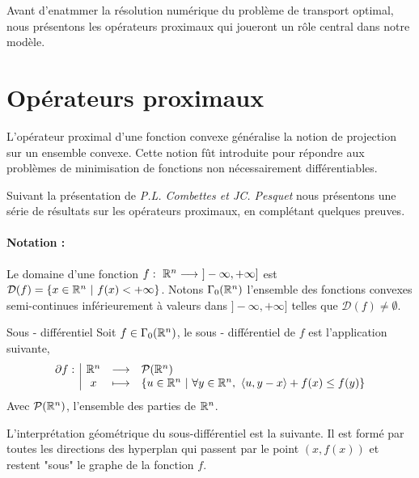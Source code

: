 \documentclass[a4paper,12pt]{article}
\begin{document}
Avant d'enatmmer la résolution numérique du problème de transport optimal, nous présentons les opérateurs proximaux qui joueront un rôle central dans notre modèle. 

\newpage
\section{Opérateurs proximaux}
L'opérateur proximal d'une fonction convexe généralise la notion de projection sur un ensemble convexe. Cette notion fût introduite pour répondre aux problèmes de minimisation de fonctions non nécessairement différentiables. 

Suivant la présentation de \emph{P.L. Combettes \emph{et} JC. Pesquet} \cite{combettes} nous présentons une série de résultats sur les opérateurs proximaux, en complétant quelques preuves.
\paragraph{Notation :}Le domaine d'une fonction $f:\ \RR^n\longrightarrow\ ]-\infty,+\infty]$ est $\mathcal{D}(f) = \{ x\in\mathbb{R}^n\ |\ f(x) < +\infty \} $. Notons $\Gamma_0(\mathbb{R}^n)$ l'ensemble des fonctions convexes semi-continues inférieurement à valeurs dans $]-\infty,+\infty]$ telles que $\mathcal{D}(f) \neq \emptyset$. 

\begin{definition}{Sous - différentiel}
Soit $f\in\Gamma_0(\mathbb{R}^n)$, le sous - différentiel de $f$ est l'application suivante,
$$
\begin{array}[t]{l|ccl} \partial f: & \mathbb{R}^n & \longrightarrow & \mathcal{P}(\mathbb{R}^n) \\ & x & \longmapsto & \left\{ u\in\mathbb{R}^n\ |\ \forall y\in\mathbb{R}^n,\ \langle u,y-x\rangle +f(x)\leq f(y) \right\} \end{array}
$$ 
Avec $\mathcal{P}(\mathbb{R}^n)$, l'ensemble des parties de $\mathbb{R}^n$.
\end{definition}


L'interprétation géométrique du sous-différentiel est la suivante. Il est formé par toutes les directions des hyperplan qui passent par le point $(x,f(x))$ et restent "sous" le graphe de la fonction $f$. \\
\end{document}
